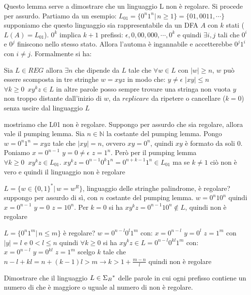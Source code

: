 Questo lemma serve a dimostrare che un linguaggio L non è regolare. Si procede per assurdo.
Partiamo da un esempio:
$L_{01}=\{0^n1^n|\,n\geq 1\}=\{01,0011,\cdots\}$
supponiamo che questo linguaggio sia rappresentabile da un DFA $A$ con $k$ stati ($L(A)=L_{01}$).
$0^k$ implica $k+1$ prefissi: $\epsilon,0,00,000,\cdots,0^k$ e quindi $\exists i,j$ tali che $0^i$ e $0^j$ finiscono nello stesso stato. Allora l'automa è ingannabile e accetterebbe $0^j1^i$ con $i\neq j$.
Formalmente si ha:
\begin{theorem}
	Sia $L\in REG$ allora $\exists n$ che dipende da $L$ tale che $\forall w\in L$ con $|w|\geq n$, $w$ può essere scomposta in tre stringhe $w=xyz$ in modo che:
	$y\neq \epsilon$
	$|xy|\leq n$
	$\forall k\geq 0\,\,\, xy^kz\in L$
	in altre parole posso sempre trovare una stringa non vuota $y$ non troppo distante dall'inizio di $w$, da $replicare$ da ripetere o cancellare ($k=0$) senza uscire dal linguaggio $L$
\end{theorem}



\begin{example}
	mostriamo che L01 non è regolare. Suppongo per assurdo che sia regolare, allora vale il pumping lemma. Sia $n\in\mathbb{N}$ la costante del pumping lemma. Pongo $w=0^n1^n=xyz$ tale che $|xy|=n$, ovvero $xy=0^n$, quindi $xy$ è formato da soli 0. Poniamo $x=0^{n-1}\,\,y=0\neq \epsilon\,\, z=1^n$. Però per il pumping lemma $\forall k\geq 0\,\,\ xy^kz\in L_{01}$.
	$xy^kz=0^{n-1}0^k1^n=0^{n+k-1}1^n\in L_{01}$
	ma se $k\neq 1$ ciò non è vero e quindi il linguaggio non è regolare
\end{example}
\begin{example}
	$L=\{w\in\{0,1\}^*|\, w=w^R\}$, linguaggio delle stringhe palindrome, è regolare?
	suppongo per assurdo di sì, con $n$ costante del pumping lemma.
	$w=0^n10^n$ quindi $x=0^{n-1}\,\,y=0\,\,z=10^n$.
	Per $k=0$ si ha $xy^kz=0^{n-1}10^n\not\in L$, quindi non è regolare
\end{example}
\begin{example}
	$L=\{0^n1^m|\, n\leq m\}$ è regolare?
	$w=0^{n-l}0^l1^{m}$ con:
	$x=0^{n-l}\,\,y=0^l\,\,z=1^{m}$
	con $|y|=l$ e $0<l\leq n$
	quindi $\forall k\geq 0$ si ha $xy^kz\in L=0^{n-l}0^{kl}1^{m}$ con:
	$x=0^{n-l}\,\,y=0^{kl}\,\,z=1^{m}$
	scelgo $k$ tale che $n-l+kl=n+(k-1)l>m\to k> 1+\frac{m-n}{l}$ quindi non è regolare
\end{example}


\begin{Exercise}\label{exe:pump-parentesi}
	Dimostrare che il linguaggio $L\in\Sigma_{B}{}^{\ast}$ delle parole in cui ogni prefisso contiene un numero di \zero che è
	maggiore o uguale al numero di \uno non è regolare.
\end{Exercise}

